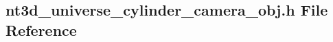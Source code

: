 \subsection{nt3d\_\-universe\_\-cylinder\_\-camera\_\-obj.h File Reference}
\label{nt3d__universe__cylinder__camera__obj_8h}
